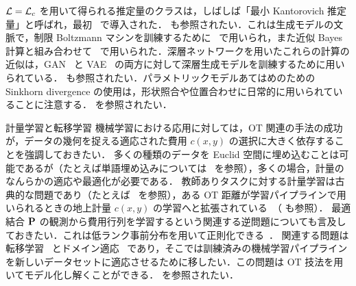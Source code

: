 $\Ll=\MK_\c$ を用いて得られる推定量のクラスは，しばしば「最小 Kantorovich 推定量」と呼ばれ，最初~\citep{bassetti2006minimum} で導入された．\citep{CanasRosasco} も参照されたい．これは生成モデルの文脈で，制限 Boltzmann マシンを訓練するために~\citep{CuturiBoltzman} で用いられ，また近似 Bayes 計算と組み合わせて~\citep{bernton2017inference} で用いられた．深層ネットワークを用いたこれらの計算の近似は，GAN~\citep{WassersteinGAN} と VAE~\citep{Bousquet2017} の両方に対して深層生成モデルを訓練するために用いられている．\citep{2017-Genevay-AutoDiff,2017-Genevay-gan-vae,salimans2018improving} も参照されたい．パラメトリックモデルあてはめのための Sinkhorn divergence の使用は，形状照合や位置合わせに日常的に用いられていることに注意する．\citep{gold1998new,chui2000new,myronenko2010point,2017-feydy-miccai} を参照されたい．


\begin{rem1}{計量学習と転移学習}
	機械学習における応用に対しては，OT 関連の手法の成功が，データの幾何を捉える適応された費用 $c(x,y)$ の選択に大きく依存することを強調しておきたい．
	多くの種類のデータを Euclid 空間に埋め込むことは可能であるが（たとえば単語埋め込みについては~\citep{mikolov2013efficient} を参照），多くの場合，計量のなんらかの適応や最適化が必要である．
	教師ありタスクに対する計量学習は古典的な問題であり（たとえば~\citep{MAL-019,weinberger2009distance} を参照），ある OT 距離が学習パイプラインで用いられるときの地上計量 $c(x,y)$ の学習へと拡張されている~\citep{CuturiGroundMetric2014}（\citealt{ZenICPR14,WangECCV12OLD,huang2016supervised} も参照）．
	最適結合 $\P$ の観測から費用行列を学習するという関連する逆問題についても言及しておきたい．これは低ランク事前分布を用いて正則化できる~\citep{dupuy2016estimating}．
	関連する問題は転移学習~\citep{pan2010survey} とドメイン適応~\citep{glorot2011domain} であり，そこでは訓練済みの機械学習パイプラインを新しいデータセットに適応させるために移したい．この問題は OT 技法を用いてモデル化し解くことができる．\citep{courty2017optimal,courty2017joint} を参照されたい．
\end{rem1}
